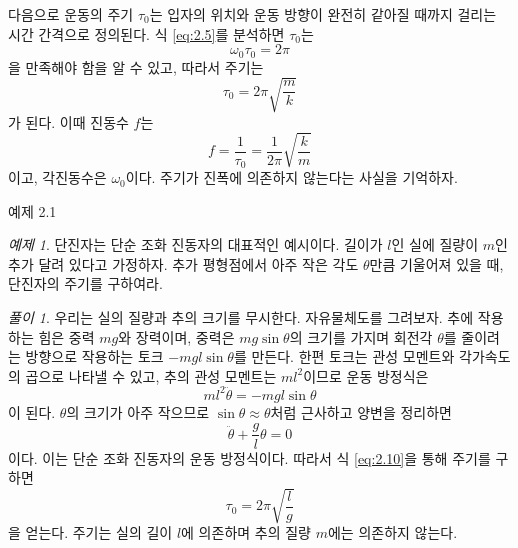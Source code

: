 \documentclass[chapter, oneside, b5paper]{oblivoir}
\theoremstyle{plain}
\theoremstyle{definition}
\theoremstyle{remark}
\newtheorem{example}{예제}[chapter]    %
\newtheorem*{solution}{풀이}
\begin{document}
다음으로 운동의 주기 $\tau_0$는 입자의 위치와 운동 방향이 완전히 같아질 때까지 걸리는 시간 간격으로 정의된다. 식 \ref{eq:2.5}를 분석하면 $\tau_0$는
\begin{equation}
    \omega_0 \tau_0 = 2\pi \label{eq:2.9}
\end{equation}
을 만족해야 함을 알 수 있고, 따라서 주기는
\begin{equation}
    \tau_0 = 2\pi \sqrt{\frac{m}{k}} \label{eq:2.10}
\end{equation}
가 된다. 이때 진동수 $f$는
\begin{equation}
    f = \frac{1}{\tau_0}=\frac{1}{2\pi}\sqrt{\frac{k}{m}} \label{eq:2.11}
\end{equation}
이고, 각진동수은 $\omega_0$이다. 주기가 진폭에 의존하지 않는다는 사실을 기억하자.

\begin{examplebox}{예제 2.1}
\begin{example}
단진자는 단순 조화 진동자의 대표적인 예시이다. 길이가 $l$인 실에 질량이 $m$인 추가 달려 있다고 가정하자. 추가 평형점에서 아주 작은 각도 $\theta$만큼 기울어져 있을 때, 단진자의 주기를 구하여라.
\end{example}
\end{examplebox}

\begin{solution}
    우리는 실의 질량과 추의 크기를 무시한다. 자유물체도를 그려보자. 추에 작용하는 힘은 중력 $mg$와 장력이며, 중력은 $mg\sin{\theta}$의 크기를 가지며 회전각 $\theta$를 줄이려는 방향으로 작용하는 토크 $-mgl\sin{\theta}$를 만든다. 한편 토크는 관성 모멘트와 각가속도의 곱으로 나타낼 수 있고, 추의 관성 모멘트는 $ml^2$이므로 운동 방정식은
    \begin{equation}
        ml^2\ddot{\theta}=-mgl\sin{\theta} \label{eq:2.12}
    \end{equation}
    이 된다. $\theta$의 크기가 아주 작으므로 $\sin{\theta} \approx \theta$처럼 근사하고 양변을 정리하면
    \begin{equation}
        \ddot{\theta} + \frac{g}{l}\theta = 0 \label{eq:2.13}
    \end{equation}
    이다. 이는 단순 조화 진동자의 운동 방정식이다. 따라서 식 \ref{eq:2.10}을 통해 주기를 구하면
    \begin{equation}
        \tau_0=2\pi \sqrt{\frac{l}{g}} \label{eq:2.14}
    \end{equation}
    을 얻는다. 주기는 실의 길이 $l$에 의존하며 추의 질량 $m$에는 의존하지 않는다.
\end{solution}
\end{document}
